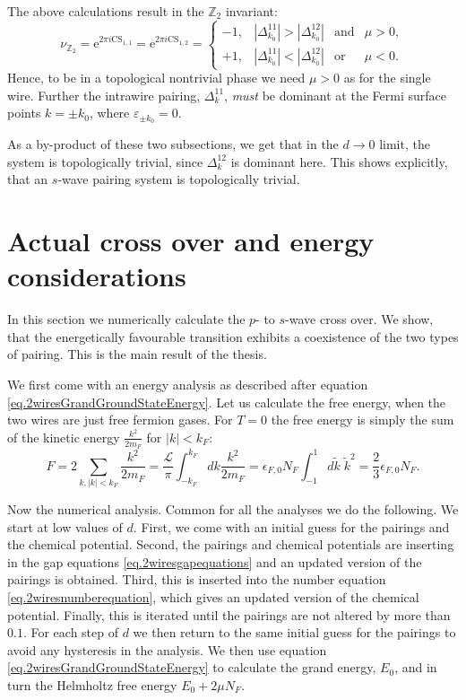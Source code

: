 The above calculations result in the $\mathbb{Z}_2$ invariant:
\begin{equation}
\nu_{\mathbb{Z}_2} = \text{e}^{2\pi i \text{CS}_{1,1}} = \text{e}^{2\pi i \text{CS}_{1,2}} = \left\{ \begin{matrix} 
-1, & |\Delta^{11}_{k_0}| > |\Delta^{12}_{k_0}| & \text{and} & \mu > 0, \\
+1, & |\Delta^{11}_{k_0}| < |\Delta^{12}_{k_0}| & \text{or}  & \mu < 0.
  \end{matrix} \right.
\label{eq.CS11T2eqminus1}
\end{equation}
Hence, to be in a topological nontrivial phase we need $\mu > 0$ as for the single wire. Further the intrawire pairing, $\Delta^{11}_k$, \textit{must} be dominant at the Fermi surface points $k = \pm k_0$, where $\varepsilon_{\pm k_0} = 0$. 

As a by-product of these two subsections, we get that in the $d \to 0$ limit, the system is topologically trivial, since $\Delta^{12}_k$ is dominant here. This shows explicitly, that an $s$-wave pairing system is topologically trivial. 

\section{Actual cross over and energy considerations}
\label{sec.2wiresCrossover_energy}
In this section we numerically calculate the $p$- to $s$-wave cross over. We show, that the energetically favourable transition exhibits a coexistence of the two types of pairing. This is the main result of the thesis. 

We first come with an energy analysis as described after equation \eqref{eq.2wiresGrandGroundStateEnergy}. Let us calculate the free energy, when the two wires are just free fermion gases. For $T = 0$ the free energy is simply the sum of the kinetic energy $\frac{k^2}{2m_F}$ for $|k| < k_F$: 
\begin{equation}
F = 2\sum_{k, |k| < k_F} \frac{k^2}{2m_F} = \frac{\mathcal{L}}{\pi} \int^{k_F}_{-k_F} dk \frac{k^2}{2m_F} = \epsilon_{F,0} N_F \int^{1}_{-1} d\tilde{k}\; \tilde{k}^2 = \frac{2}{3}\epsilon_{F,0} N_F. 
\end{equation}

Now the numerical analysis. Common for all the analyses we do the following. We start at low values of $d$. First, we come with an initial guess for the pairings and the chemical potential. Second, the pairings and chemical potentials are inserting in the gap equations \ref{eq.2wiresgapequations} and an updated version of the pairings is obtained. Third, this is inserted into the number equation \ref{eq.2wiresnumberequation}, which gives an updated version of the chemical potential. Finally, this is iterated until the pairings are not altered by more than $0.1$\textperthousand. For each step of $d$ we then return to the same initial guess for the pairings to avoid any hysteresis in the analysis. We then use equation \eqref{eq.2wiresGrandGroundStateEnergy} to calculate the grand energy, $E_0$, and in turn the Helmholtz free energy $E_0 + 2\mu N_F$.  

